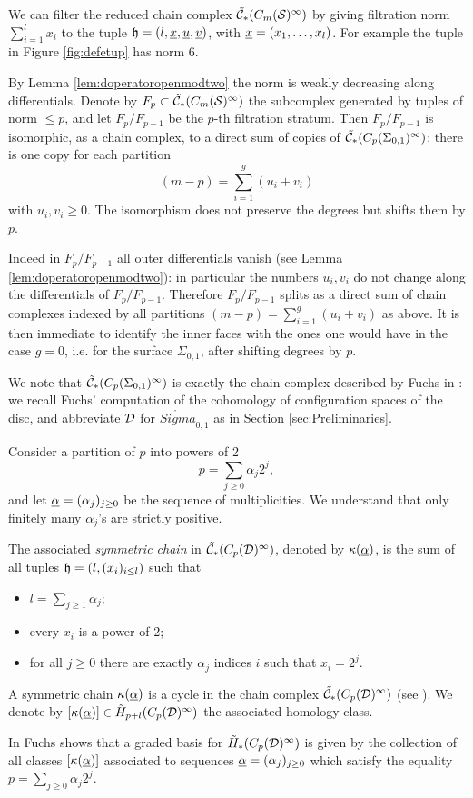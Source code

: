 We can filter the reduced chain complex $\tilde{\mathcal{C}}_*(C_m(\mathcal{S})^{\infty})$ by giving filtration norm $\sum_{i=1}^lx_i$ to
the tuple $\mathfrak{h}=(l,\underline{x},\underline{u},\underline{v})$, with $\underline{x}=(x_1,\dots,x_l)$. For example
the tuple in Figure \ref{fig:defetup} has norm 6.

By Lemma \ref{lem:doperatoropenmodtwo}
the norm is weakly decreasing along differentials. Denote by $F_p\subset\tilde{\mathcal{C}}_*(C_m(\mathcal{S})^{\infty})$ the subcomplex generated by
tuples of norm $\leq p$, and let $F_p/F_{p-1}$ be the $p$-th filtration stratum.
Then $F_p/F_{p-1}$ is isomorphic, as a chain complex, to a direct sum of copies of $\tilde{\mathcal{C}}_*(C_p(\Sigma_{0,1})^{\infty})$:
there is one copy for each partition
\[
(m-p)=\sum_{i=1}^g (u_i+v_i)
\]
with $u_i,v_i\geq 0$. The isomorphism
does not preserve the degrees but shifts them by $p$.

Indeed in $F_p/F_{p-1}$ all outer
differentials vanish (see Lemma \ref{lem:doperatoropenmodtwo}): in particular the numbers $u_i,v_i$
do not change along the differentials of $F_p/F_{p-1}$. Therefore $F_p/F_{p-1}$ splits as a direct sum
of chain complexes indexed by all partitions $(m-p)=\sum_{i=1}^g (u_i+v_i)$ as above.
It is then immediate to identify the inner faces
with the ones one would have in the case $g=0$, i.e. for the surface $\Sigma_{0,1}$, after shifting
degrees by $p$.

We note that $\tilde{\mathcal{C}}_*(C_p(\Sigma_{0,1})^{\infty})$ is exactly the chain complex described by Fuchs in
\cite{Fuchs:CohomBraidModtwo}: we recall Fuchs' computation of the cohomology of configuration
spaces of the disc, and abbreviate $\mathcal{D}$ for $\mathring{Sigma}_{0,1}$ as in Section \ref{sec:Preliminaries}.
\begin{defn}
\label{defn:symchain}
Consider a partition of $p$ into powers of 2
\[
 p=\sum_{j\geq 0}\alpha_j2^j,
\]
and let $\underline{\alpha}=(\alpha_j)_{j\geq 0}$ be the sequence of multiplicities. We understand that only finitely
many $\alpha_j$'s are strictly positive.

The associated \emph{symmetric chain} in $\tilde{\mathcal{C}}_*(C_p(\mathcal{D})^{\infty})$, denoted by $\kappa(\underline{\alpha})$,
is the sum of all tuples $\mathfrak{h}=\left(l,(x_i)_{i\leq l}\right)$ such that
\begin{itemize}
 \item $l=\sum_{j\geq 1}\alpha_j$;
 \item every $x_i$ is a power of 2;
 \item for all $j\geq 0$ there are exactly $\alpha_j$ indices $i$ such that $x_i=2^j$.
\end{itemize}
A symmetric chain $\kappa(\underline{\alpha})$ is a cycle in the chain complex $\tilde{\mathcal{C}}_*(C_p(\mathcal{D})^{\infty})$ (see \cite{Fuchs:CohomBraidModtwo}).
We denote by $[\kappa(\underline{\alpha})]\in\tilde{H}_{p+l}(C_p(\mathcal{D})^{\infty})$ the associated homology class.
\end{defn}
In \cite{Fuchs:CohomBraidModtwo} Fuchs shows that a graded basis for $\tilde{H}_*(C_p(\mathcal{D})^{\infty})$
is given by the collection of all classes $[\kappa(\underline{\alpha})]$ associated to sequences $\underline{\alpha}=(\alpha_j)_{j\geq 0}$
which satisfy the equality $p=\sum_{j\geq 0}\alpha_j2^j$.

